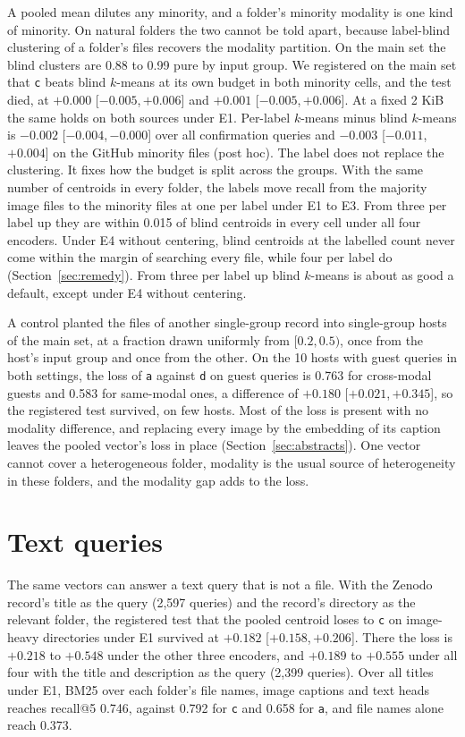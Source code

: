 \documentclass[sigconf,natbib=true,anonymous=true]{acmart}
\newcommand{\rep}[1]{\texttt{#1}}
\newcommand{\ci}[2]{[\ensuremath{#1},\,\ensuremath{#2}]}  %
\begin{document}
A pooled mean dilutes any minority, and a folder's minority modality is one kind of minority. On natural folders the two cannot be told apart, because label-blind clustering of a folder's files recovers the modality partition. On the main set the blind clusters are 0.88 to 0.99 pure by input group. We registered on the main set that \rep{c} beats blind $k$-means at its own budget in both minority cells, and the test died, at $+0.000$ \ci{-0.005}{+0.006} and $+0.001$ \ci{-0.005}{+0.006}. At a fixed 2 KiB the same holds on both sources under E1. Per-label $k$-means minus blind $k$-means is $-0.002$ \ci{-0.004}{-0.000} over all confirmation queries and $-0.003$ \ci{-0.011}{+0.004} on the GitHub minority files (post hoc). The label does not replace the clustering. It fixes how the budget is split across the groups. With the same number of centroids in every folder, the labels move recall from the majority image files to the minority files at one per label under E1 to E3. From three per label up they are within 0.015 of blind centroids in every cell under all four encoders. Under E4 without centering, blind centroids at the labelled count never come within the margin of searching every file, while four per label do (Section~\ref{sec:remedy}). From three per label up blind $k$-means is about as good a default, except under E4 without centering.

A control planted the files of another single-group record into single-group hosts of the main set, at a fraction drawn uniformly from $[0.2, 0.5)$, once from the host's input group and once from the other. On the 10 hosts with guest queries in both settings, the loss of \rep{a} against \rep{d} on guest queries is 0.763 for cross-modal guests and 0.583 for same-modal ones, a difference of $+0.180$ \ci{+0.021}{+0.345}, so the registered test survived, on few hosts. Most of the loss is present with no modality difference, and replacing every image by the embedding of its caption leaves the pooled vector's loss in place (Section~\ref{sec:abstracts}). One vector cannot cover a heterogeneous folder, modality is the usual source of heterogeneity in these folders, and the modality gap adds to the loss.

\section{Text queries}
\label{sec:nlq}

The same vectors can answer a text query that is not a file. With the Zenodo record's title as the query (2,597 queries) and the record's directory as the relevant folder, the registered test that the pooled centroid loses to \rep{c} on image-heavy directories under E1 survived at $+0.182$ \ci{+0.158}{+0.206}. There the loss is $+0.218$ to $+0.548$ under the other three encoders, and $+0.189$ to $+0.555$ under all four with the title and description as the query (2,399 queries). Over all titles under E1, BM25 over each folder's file names, image captions and text heads reaches recall@5 0.746, against 0.792 for \rep{c} and 0.658 for \rep{a}, and file names alone reach 0.373.
\end{document}

